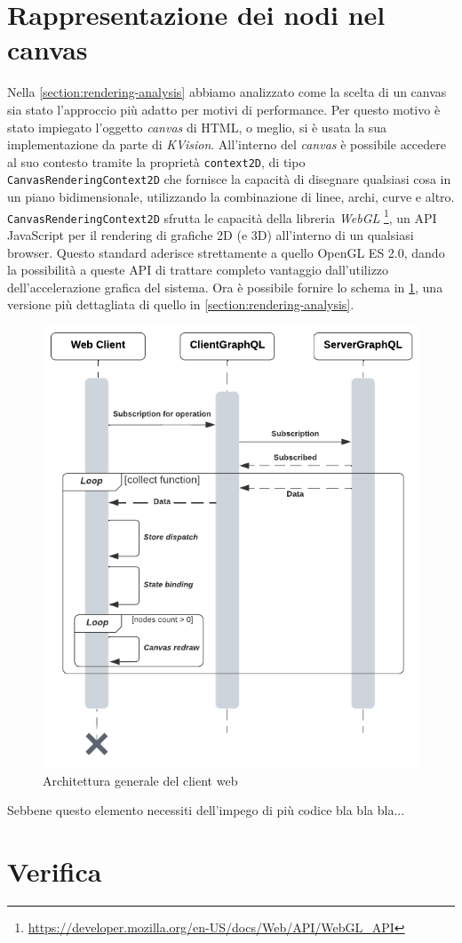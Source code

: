 \section{Rappresentazione dei nodi nel canvas}
Nella \cref{section:rendering-analysis} abbiamo analizzato come la scelta di un canvas sia stato l'approccio più adatto per motivi di performance. Per questo motivo è stato impiegato l'oggetto \textit{canvas} di HTML, o meglio, si è usata la sua implementazione da parte di \textit{KVision}. All'interno del \textit{canvas} è possibile accedere al suo contesto tramite la proprietà \texttt{context2D}, di tipo \texttt{CanvasRenderingContext2D} che fornisce la capacità di disegnare qualsiasi cosa in un piano bidimensionale, utilizzando la combinazione di linee, archi, curve e altro. \texttt{CanvasRenderingContext2D} sfrutta le capacità della libreria \textit{WebGL} \footnote{\url{https://developer.mozilla.org/en-US/docs/Web/API/WebGL_API}}, un \ac{API} JavaScript per il rendering di grafiche 2D (e 3D) all'interno di un qualsiasi browser. Questo standard aderisce strettamente a quello OpenGL ES 2.0, dando la possibilità a queste \ac{API} di trattare completo vantaggio dall'utilizzo dell'accelerazione grafica del sistema.
Ora è possibile fornire lo schema in \cref{fig:sequence-rendering-advance}, una versione più dettagliata di quello in \cref{section:rendering-analysis}. 

\begin{figure}[htb]
	\centering
	\includegraphics[scale=0.8]{imgs/Sequenza_rendering_plus.pdf}
	\caption{Architettura generale del client web}
	\label{fig:sequence-rendering-advance}
\end{figure}




Sebbene questo elemento necessiti dell'impego di più codice bla bla bla...






\section{Verifica}